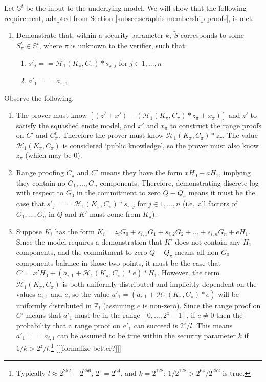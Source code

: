 \begin{appendices}
Let $\mathbb{S}^t$ be the input to the underlying model. We will show that the following requirement, adapted from Section \ref{subsec:seraphis-membership proofs}, is met.

\begin{enumerate}
    \item Demonstrate that, within a security parameter $k$, $\tilde{S}$ corresponds to some $S^t_{\pi} \in \mathbb{S}^t$, where $\pi$ is unknown to the verifier, such that:
    \begin{enumerate}
        \item $s'_j == \mathcal{H}_1(K_{\pi}, C_{\pi})*s_{\pi,j}$ for $j \in 1,...,n$
        \item $a'_1 == a_{\pi,1}$
    \end{enumerate}
\end{enumerate}

Observe the following.

\begin{enumerate}
    \item The prover must know $[(z' + x') - (\mathcal{H}_1(K_{\pi}, C_{\pi})*z_{\pi} + x_{\pi})]$ and $z'$ to satisfy the squashed enote model, and $x'$ and $x_{\pi}$ to construct the range proofs on $C'$ and $C^t_{\pi}$. Therefore the prover must know $\mathcal{H}_1(K_{\pi}, C_{\pi})*z_{\pi}$. The value $\mathcal{H}_1(K_{\pi}, C_{\pi})$ is considered `public knowledge', so the prover must also know $z_{\pi}$ (which may be 0).

    \item Range proofing $C_{\pi}$ and $C'$ means they have the form $x H_0 + a H_1$, implying they contain no $G_1,...,G_n$ components. Therefore, demonstrating discrete log with respect to $G_0$ in the commitment to zero $\tilde{Q} - Q_{\pi}$ means it must be the case that $s'_j == \mathcal{H}_1(K_{\pi}, C_{\pi})*s_{\pi,j}$ for $j \in 1,...,n$ (i.e.\ all factors of $G_1,...,G_n$ in $\tilde{Q}$ and $K'$ must come from $K_{\pi}$).

    \item Suppose $K_i$ has the form $K_i = z_i G_0 + s_{i,1} G_1 + s_{i,2} G_2 + ... + s_{i,n} G_n + e H_1$. Since the model requires a demonstration that $K'$ does not contain any $H_1$ components, and the commitment to zero $\tilde{Q} - Q_{\pi}$ means all non-$G_0$ components balance in those two points, it must be the case that $C' = x' H_0 + (a_{i,1} + \mathcal{H}_1(K_{\pi}, C_{\pi})*e)*H_1$. However, the term $\mathcal{H}_1(K_{\pi}, C_{\pi})$ is both uniformly distributed and implicitly dependent on the values $a_{i,1}$ and $e$, so the value $a'_1 = (a_{i,1} + \mathcal{H}_1(K_{\pi}, C_{\pi})*e)$ will be uniformly distributed in $\mathbb{Z}_l$ (assuming $e$ is non-zero). Since the range proof on $C'$ means that $a'_1$ must be in the range $[0,...,2^z - 1]$, if $e \neq 0$ then the probability that a range proof on $a'_1$ can succeed is $2^z/l$. This means $a'_1 == a_{i,1}$ can be assumed to be true within the security parameter $k$ if $1/k > 2^z/l$.\footnote{Typically $l \approx 2^{252} - 2^{256}$, $2^z = 2^{64}$, and $k = 2^{128}$; $1/2^{128} > 2^{64}/2^{252}$ is true.} [[[formalize better?]]]
\end{enumerate}


\end{appendices}
